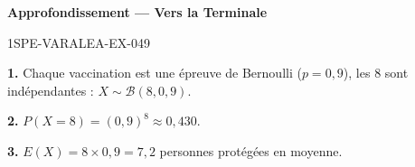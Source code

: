 \begin{center}\textbf{Approfondissement — Vers la Terminale}\end{center}
\begin{corrige}{1SPE-VARALEA-EX-049}

\textbf{1.} Chaque vaccination est une épreuve de Bernoulli ($p = 0{,}9$), les $8$ sont indépendantes : $X \sim \mathcal{B}(8, 0{,}9)$.

\medskip
\textbf{2.} $P(X=8) = (0{,}9)^8 \approx 0{,}430$.

\medskip
\textbf{3.} $E(X) = 8 \times 0{,}9 = 7{,}2$ personnes protégées en moyenne.

\end{corrige}
